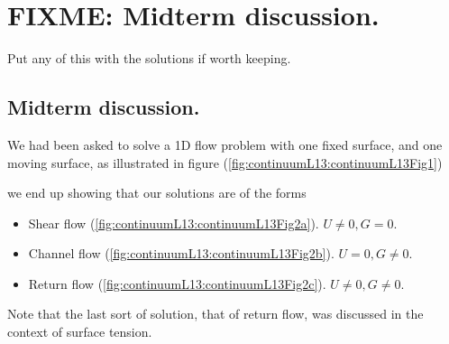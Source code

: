 \chapter{FIXME: Midterm discussion.}

Put any of this with the solutions if worth keeping.

\section{Midterm discussion.}

We had been asked to solve a 1D flow problem with one fixed surface, and one moving surface, as illustrated in figure (\ref{fig:continuumL13:continuumL13Fig1})

we end up showing that our solutions are of the forms

\begin{itemize}
\item 
Shear flow (\ref{fig:continuumL13:continuumL13Fig2a}).  $U \ne 0, G = 0$.
\item Channel flow (\ref{fig:continuumL13:continuumL13Fig2b}).  $U = 0, G \ne 0$.
\item Return flow (\ref{fig:continuumL13:continuumL13Fig2c}).  $U \ne 0, G \ne 0$.
\end{itemize}

Note that the last sort of solution, that of return flow, was discussed in the context of surface tension.

